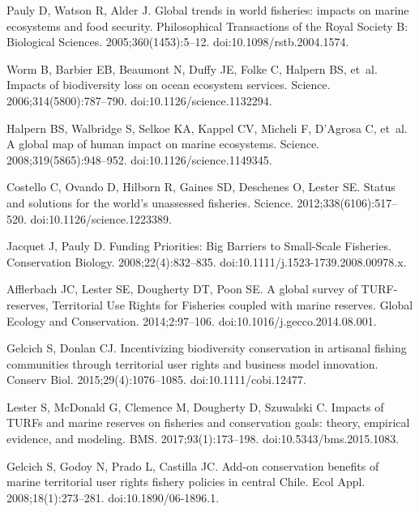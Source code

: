 \documentclass[10pt,letterpaper]{article}
\begin{document}
% 
\begin{thebibliography}{10}

Pauly D, Watson R, Alder J.
\newblock Global trends in world fisheries: impacts on marine ecosystems and
  food security.
\newblock Philosophical Transactions of the Royal Society B: Biological
  Sciences. 2005;360(1453):5--12.
\newblock doi:{10.1098/rstb.2004.1574}.

Worm B, Barbier EB, Beaumont N, Duffy JE, Folke C, Halpern BS, et~al.
\newblock Impacts of biodiversity loss on ocean ecosystem services.
\newblock Science. 2006;314(5800):787--790.
\newblock doi:{10.1126/science.1132294}.

Halpern BS, Walbridge S, Selkoe KA, Kappel CV, Micheli F, D'Agrosa C, et~al.
\newblock A global map of human impact on marine ecosystems.
\newblock Science. 2008;319(5865):948--952.
\newblock doi:{10.1126/science.1149345}.

Costello C, Ovando D, Hilborn R, Gaines SD, Deschenes O, Lester SE.
\newblock Status and solutions for the world's unassessed fisheries.
\newblock Science. 2012;338(6106):517--520.
\newblock doi:{10.1126/science.1223389}.

Jacquet J, Pauly D.
\newblock Funding Priorities: Big Barriers to Small-Scale Fisheries.
\newblock Conservation Biology. 2008;22(4):832--835.
\newblock doi:{10.1111/j.1523-1739.2008.00978.x}.

Afflerbach JC, Lester SE, Dougherty DT, Poon SE.
\newblock A global survey of TURF-reserves, Territorial Use Rights for
  Fisheries coupled with marine reserves.
\newblock Global Ecology and Conservation. 2014;2:97--106.
\newblock doi:{10.1016/j.gecco.2014.08.001}.

Gelcich S, Donlan CJ.
\newblock Incentivizing biodiversity conservation in artisanal fishing
  communities through territorial user rights and business model innovation.
\newblock Conserv Biol. 2015;29(4):1076--1085.
\newblock doi:{10.1111/cobi.12477}.

Lester S, McDonald G, Clemence M, Dougherty D, Szuwalski C.
\newblock Impacts of TURFs and marine reserves on fisheries and conservation
  goals: theory, empirical evidence, and modeling.
\newblock BMS. 2017;93(1):173--198.
\newblock doi:{10.5343/bms.2015.1083}.

Gelcich S, Godoy N, Prado L, Castilla JC.
\newblock Add-on conservation benefits of marine territorial user rights
  fishery policies in central Chile.
\newblock Ecol Appl. 2008;18(1):273--281.
\newblock doi:{10.1890/06-1896.1}.


\end{thebibliography}
\end{document}
